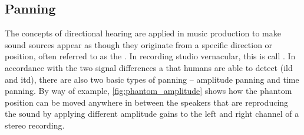 \subsection{Panning}
\label{sec:panning}
The concepts of directional hearing are applied in music production to make sound sources appear as though they originate from a specific direction or position, often referred to as the . In recording studio vernacular, this is call . In accordance with the two signal differences a that humans are able to detect (\gls{ild} and \gls{itd}), there are also two basic types of panning -- amplitude panning and time panning. By way of example, \cref{fig:phantom_amplitude} shows how the phantom position can be moved anywhere in between the speakers that are reproducing the sound by applying different amplitude gains to the left and right channel of a stereo recording.

